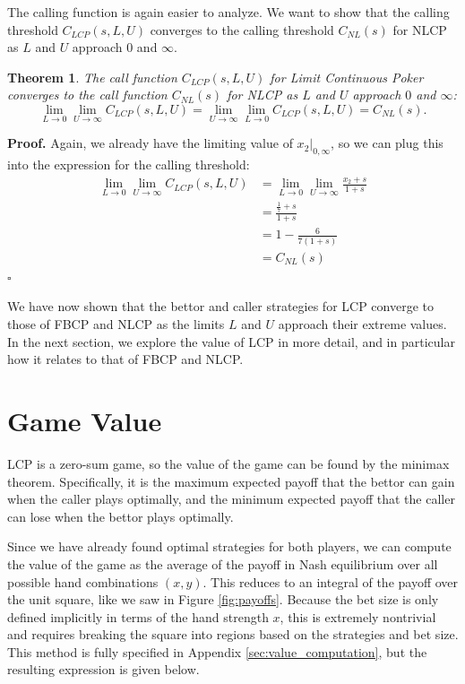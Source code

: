 \documentclass[a4paper,12pt]{article}
\theoremstyle{plain}
\newtheorem{theorem}{Theorem}[section]
\theoremstyle{definition}
\newenvironment{customproof}[1][Proof]{\noindent\textbf{#1.} }{\hfill$\square$\vspace{1em}}
\begin{document}
The calling function is again easier to analyze. We want to show that the calling threshold $C_{LCP}(s, L, U)$ converges to the calling threshold $C_{NL}(s)$ for NLCP as $L$ and $U$ approach $0$ and $\infty$.
\begin{theorem}
    The call function $C_{LCP}(s, L, U)$ for Limit Continuous Poker converges to the call function $C_{NL}(s)$ for NLCP as $L$ and $U$ approach $0$ and $\infty$:
\[
\lim_{L \to 0} \lim_{U \to \infty} C_{LCP}(s, L, U) = \lim_{U \to \infty} \lim_{L \to 0} C_{LCP}(s, L, U) = C_{NL}(s).
\]
\end{theorem}
\begin{customproof}
Again, we already have the limiting value of $x_2|_{0,\infty}$, so we can plug this into the expression for the calling threshold:
\begin{align*}
    \lim_{L \to 0} \lim_{U \to \infty} C_{LCP}(s, L, U) & = \lim_{L \to 0} \lim_{U \to \infty} \frac{x_2+s}{1+s}\\
    & = \frac{\frac{1}{7}+s}{1+s}\\
    & = 1 - \frac{6}{7(1+s)}\\
    & = C_{NL}(s)
\end{align*}
\end{customproof}

We have now shown that the bettor and caller strategies for LCP converge to those of FBCP and NLCP as the limits $L$ and $U$ approach their extreme values. In the next section, we explore the value of LCP in more detail, and in particular how it relates to that of FBCP and NLCP.

\section{Game Value}
\label{sec:game_value}

LCP is a zero-sum game, so the value of the game can be found by the minimax theorem. Specifically, it is the maximum expected payoff that the bettor can gain when the caller plays optimally, and the minimum expected payoff that the caller can lose when the bettor plays optimally.

Since we have already found optimal strategies for both players, we can compute the value of the game as the average of the payoff in Nash equilibrium over all possible hand combinations $(x, y)$. This reduces to an integral of the payoff over the unit square, like we saw in Figure \ref{fig:payoffs}. Because the bet size is only defined implicitly in terms of the hand strength $x$, this is extremely nontrivial and requires breaking the square into regions based on the strategies and bet size. This method is fully specified in Appendix \ref{sec:value_computation}, but the resulting expression is given below.
\end{document}
